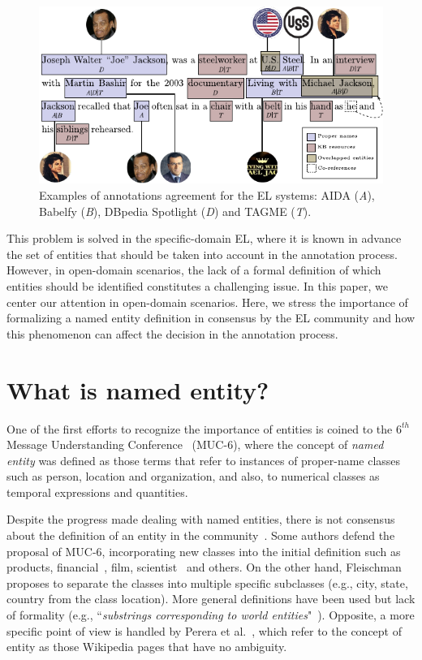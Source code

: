 \documentclass{llncs}
\begin{document}
\begin{figure}[htb!]
\label{fig:example}
\includegraphics[width=1\textwidth]{figs/fig_annotation_example1}
\caption{Examples of annotations agreement for the EL systems: AIDA (\textit{A}), Babelfy (\textit{B}), DBpedia Spotlight (\textit{D}) and TAGME (\textit{T}). }
\end{figure}

This problem is solved in the specific-domain EL, where it is known in advance the set of entities that should be taken into account in the annotation process. However, in open-domain scenarios, the lack of a formal definition of which entities should be identified constitutes a challenging issue. In this paper, we center our attention in open-domain scenarios. Here, we stress the importance of formalizing a named entity definition in consensus by the EL community and how this phenomenon can affect the decision in the annotation process.


\section{What is named entity?}

One of the first efforts to recognize the importance of entities is coined to the $6^{th}$ Message Understanding Conference~\cite{MUC6} (MUC-6), where the concept of \textit{named entity} was defined as those terms that refer to instances of proper-name classes such as person, location and organization, and also, to numerical classes as temporal expressions and quantities. 


Despite the progress made dealing with named entities, there is not consensus about the definition of an entity in the community~\cite{Borrega007,Ling2015}. Some authors defend the proposal of MUC-6, incorporating new classes into the initial definition such as products, financial~\cite{meantime16}, film, scientist~\cite{Etzioni05} and others. On the other hand, Fleischman~\cite{Fleischman001} proposes to separate the classes into multiple specific subclasses (e.g., city, state, country from the class location). More general definitions have been used but lack of formality\cite{Eckhardt14,Uren06} (e.g., ``\textit{substrings corresponding to world entities}"~\cite{Ling2015}). Opposite, a more specific point of view is handled by Perera et al.~\cite{Perera16}, which refer to the concept of entity as those Wikipedia pages that have no ambiguity.
\end{document}
